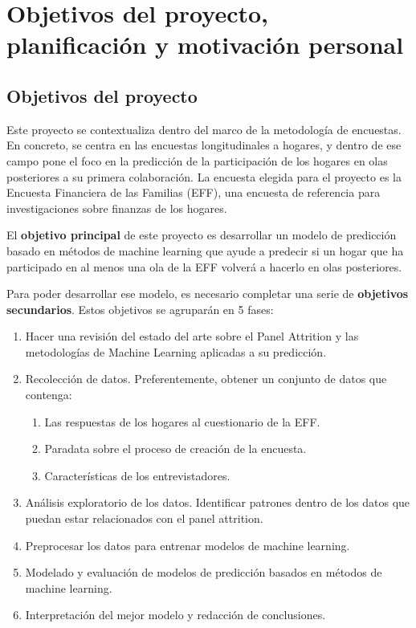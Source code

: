 \chapter{Objetivos del proyecto, planificación y motivación personal}
\label{chapter:objetivos}
\section{Objetivos del proyecto}

Este proyecto se contextualiza dentro del marco de la metodología de encuestas. En concreto, se centra en las encuestas longitudinales a hogares, y dentro de ese campo pone el foco en la predicción de la participación de los hogares en olas posteriores a su primera colaboración. La encuesta elegida para el proyecto es la Encuesta Financiera de las Familias (EFF), una encuesta de referencia para investigaciones sobre finanzas de los hogares.

El \textbf{objetivo principal} de este proyecto es desarrollar un modelo de predicción basado en métodos de machine learning que ayude a predecir si un hogar que ha participado en al menos una ola de la EFF volverá a hacerlo en olas posteriores.

Para poder desarrollar ese modelo, es necesario completar una serie de \textbf{objetivos secundarios}. Estos objetivos se agruparán en 5 fases:

\begin{enumerate}[noitemsep]
    \item Hacer una revisión del estado del arte sobre el Panel Attrition y las metodologías de Machine Learning aplicadas a su predicción.
    \item Recolección de datos. Preferentemente, obtener un conjunto de datos que contenga:
    \begin{enumerate}
        \item Las respuestas de los hogares al cuestionario de la EFF.
        \item Paradata sobre el proceso de creación de la encuesta.
        \item Características de los entrevistadores.
    \end{enumerate}
    \item Análisis exploratorio de los datos. Identificar patrones dentro de los datos que puedan estar relacionados con el panel attrition.
    \item Preprocesar los datos para entrenar modelos de machine learning.
    \item Modelado y evaluación de modelos de predicción basados en métodos de machine learning.
    \item Interpretación del mejor modelo y redacción de conclusiones.
\end{enumerate}

